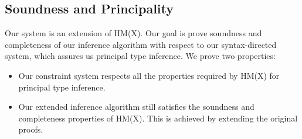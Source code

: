 
\subsection{Soundness and Principality}

Our system is an extension of HM(X). Our goal is prove soundness and completeness
of our inference algorithm with respect to our syntax-directed system, which
assures us principal type inference.
We prove two properties:
\begin{itemize}
\item Our constraint system respects all the properties required by HM(X)
  for principal type inference.
\item Our extended inference algorithm still satisfies the soundness
  and completeness properties of HM(X). This is achieved by extending
  the original proofs.
\end{itemize}


